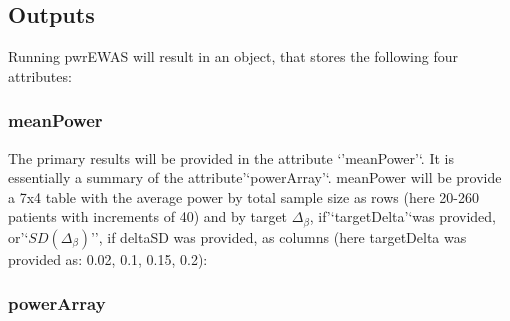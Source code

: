 \documentclass[]{article}
\newcommand{\hlstd}[1]{\textcolor[rgb]{0.251,0.251,0.251}{#1}}%
\newcommand{\hlkwd}[1]{\textcolor[rgb]{0.878,0.439,0.125}{#1}}%
\newenvironment{Shaded}{\begin{myshaded}}{\end{myshaded}}
\newcommand{\KeywordTok}[1]{\hlkwd{#1}}
\newcommand{\NormalTok}[1]{\hlstd{#1}}
\begin{document}
\subsection{Outputs}\label{outputs}

Running pwrEWAS will result in an object, that stores the following four
attributes:

\begin{Shaded}
\end{Shaded}

\subsubsection{meanPower}\label{meanpower}

The primary results will be provided in the attribute `'meanPower'`. It
is essentially a summary of the attribute'`powerArray'`. meanPower will
be provide a 7x4 table with the average power by total sample size as
rows (here 20-260 patients with increments of 40) and by target
\(\Delta_\beta\), if'`targetDelta'`was provided,
or'`\(SD(\Delta_\beta)\)'', if deltaSD was provided, as columns (here
targetDelta was provided as: 0.02, 0.1, 0.15, 0.2):

\begin{Shaded}
\end{Shaded}

\subsubsection{powerArray}\label{powerarray}
\end{document}
